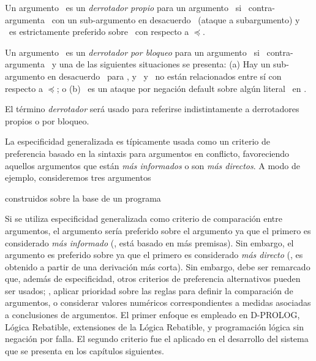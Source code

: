  \begin{definicion}
 \label{def:derrotadores}
 
 Un argumento \AaQa\ es un \textit{derrotador propio} para un argumento
 \AbQb\ si \AaQa\ contra-argumenta \AbQb\ con un sub-argumento en
 desacuerdo \AQ\ (ataque a subargumento) y \AaQa\ es estrictamente
 preferido sobre \AQ\ con respecto a $\preceq$.
 
 Un argumento \AaQa\ es un \textit{derrotador por bloqueo} para un
 argumento \AbQb\ si \AaQa\ contra-argumenta \AbQb\ y una de las
 siguientes situaciones se presenta: (a) Hay un sub-argumento en
 desacuerdo \AQ\ para \AbQb, y \AaQa\ y \AQ\ no están relacionados
 entre sí con respecto a $\preceq$; o (b) \AaQa\ es un ataque  por
 negación default sobre algún literal \negda{\ArgQa}\ en \AbQb.
 
 El término \textit{derrotador} será usado para referirse
 indistintamente a derrotadores propios o por bloqueo.
 \end{definicion}
 
 La especificidad generalizada es típicamente usada como un criterio de
 preferencia basado en la sintaxis  para argumentos en conflicto,
 favoreciendo aquellos argumentos que están \textit{más informados} o
 son  \textit{más directos}. A modo de ejemplo, consideremos tres
 argumentos 


 \noindent
 construidos sobre la base de un programa 


 Si se utiliza especificidad generalizada como criterio de
 comparación entre argumentos, el argumento  
 sería preferido sobre el argumento  ya
 que el primero es considerado \textit{más informado} (\ie, está basado
 en más premisas). Sin embargo, el argumento   es preferido sobre  
 ya que el primero es considerado
 \textit{más directo} (\ie, es obtenido a partir de una derivación más
 corta). Sin embargo, debe ser remarcado que, además de especificidad,
 otros criterios de preferencia alternativos pueden ser usados;  \eg,
 aplicar prioridad sobre las reglas para definir la comparación de
 argumentos, o considerar valores  numéricos correspondientes a medidas
 asociadas a conclusiones de argumentos. El primer enfoque es empleado
 en {\footnotesize D}-P{\footnotesize ROLOG}, Lógica Rebatible,
 extensiones de la Lógica Rebatible, y programación lógica sin negación
 por falla. El segundo criterio fue el aplicado en el desarrollo del
 sistema que se presenta en los capítulos siguientes.

